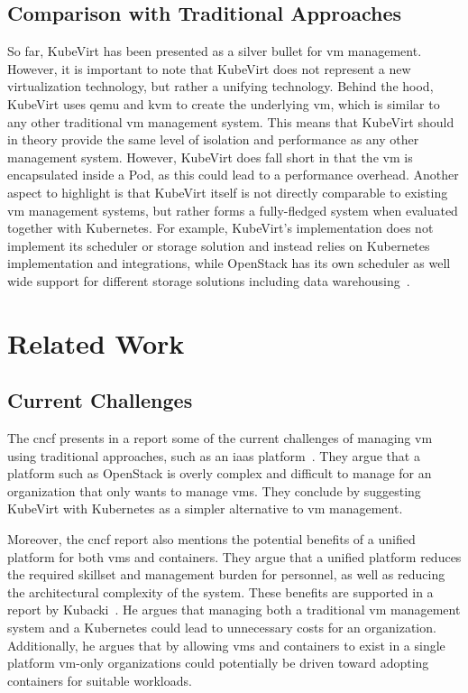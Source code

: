 \documentclass{kththesis}
\begin{document}
\subsection{Comparison with Traditional Approaches}
So far, KubeVirt has been presented as a silver bullet for \Gls{vm} management. However, it is important to note that KubeVirt does not represent a new virtualization technology, but rather a unifying technology. Behind the hood, KubeVirt uses \Gls{qemu} and \Gls{kvm} to create the underlying \Gls{vm}, which is similar to any other traditional \Gls{vm} management system. This means that KubeVirt should in theory provide the same level of isolation and performance as any other management system. However, KubeVirt does fall short in that the \Gls{vm} is encapsulated inside a Pod, as this could lead to a performance overhead. Another aspect to highlight is that KubeVirt itself is not directly comparable to existing \Gls{vm} management systems, but rather forms a fully-fledged system when evaluated together with Kubernetes. For example, KubeVirt's implementation does not implement its scheduler or storage solution and instead relies on Kubernetes implementation and integrations, while OpenStack has its own scheduler as well wide support for different storage solutions including data warehousing\ \cite{kubevirt-tech-comparison, kubevirt-architecture, kubevirt-network-plugin, kubevirt-disks}.

\section{Related Work}
\label{literature-study}
\subsection{Current Challenges}
The \Gls{cncf} presents in a report some of the current challenges of managing \Gls{vm} using traditional approaches, such as an \Gls{iaas} platform\ \cite{kubevirt-cncf}. They argue that a platform such as OpenStack is overly complex and difficult to manage for an organization that only wants to manage \Glspl{vm}. They conclude by suggesting KubeVirt with Kubernetes as a simpler alternative to \Gls{vm} management.

Moreover, the \Gls{cncf} report also mentions the potential benefits of a unified platform for both \Glspl{vm} and containers. They argue that a unified platform reduces the required skillset and management burden for personnel, as well as reducing the architectural complexity of the system. These benefits are supported in a report by Kubacki\ \cite{kubevirt-storware}. He argues that managing both a traditional \Gls{vm} management system and a Kubernetes could lead to unnecessary costs for an organization. Additionally, he argues that by allowing \Glspl{vm} and containers to exist in a single platform \Gls{vm}-only organizations could potentially be driven toward adopting containers for suitable workloads. 
\end{document}
